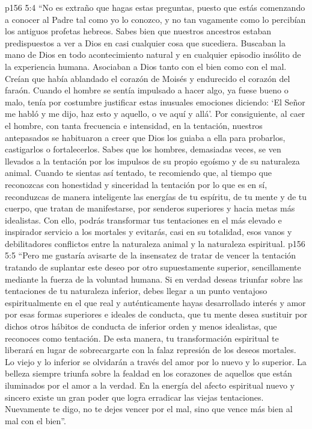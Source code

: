 \vs p156 5:4 “No es extraño que hagas estas preguntas, puesto que estás comenzando a conocer al Padre tal como yo lo conozco, y no tan vagamente como lo percibían los antiguos profetas hebreos. Sabes bien que nuestros ancestros estaban predispuestos a ver a Dios en casi cualquier cosa que sucediera. Buscaban la mano de Dios en todo acontecimiento natural y en cualquier episodio insólito de la experiencia humana. Asociaban a Dios tanto con el bien como con el mal. Creían que había ablandado el corazón de Moisés y endurecido el corazón del faraón. Cuando el hombre se sentía impulsado a hacer algo, ya fuese bueno o malo, tenía por costumbre justificar estas inusuales emociones diciendo: ‘El Señor me habló y me dijo, haz esto y aquello, o ve aquí y allá’. Por consiguiente, al caer el hombre, con tanta frecuencia e intensidad, en la tentación, nuestros antepasados se habituaron a creer que Dios los guiaba a ella para probarlos, castigarlos o fortalecerlos. Sabes que los hombres, demasiadas veces, se ven llevados a la tentación por los impulsos de su propio egoísmo y de su naturaleza animal. Cuando te sientas así tentado, te recomiendo que, al tiempo que reconozcas con honestidad y sinceridad la tentación por lo que es en sí, reconduzcas de manera inteligente las energías de tu espíritu, de tu mente y de tu cuerpo, que tratan de manifestarse, por senderos superiores y hacia metas más idealistas. Con ello, podrás transformar tus tentaciones en el más elevado e inspirador servicio a los mortales y evitarás, casi en su totalidad, esos vanos y debilitadores conflictos entre la naturaleza animal y la naturaleza espiritual.
\vs p156 5:5 “Pero me gustaría avisarte de la insensatez de tratar de vencer la tentación tratando de suplantar este deseo por otro supuestamente superior, sencillamente mediante la fuerza de la voluntad humana. Si en verdad deseas triunfar sobre las tentaciones de tu naturaleza inferior, debes llegar a un punto ventajoso espiritualmente en el que real y auténticamente hayas desarrollado interés y amor por esas formas superiores e ideales de conducta, que tu mente desea sustituir por dichos otros hábitos de conducta de inferior orden y menos idealistas, que reconoces como tentación. De esta manera, tu transformación espiritual te liberará en lugar de sobrecargarte con la falaz represión de los deseos mortales. Lo viejo y lo inferior se olvidarán a través del amor por lo nuevo y lo superior. La belleza siempre triunfa sobre la fealdad en los corazones de aquellos que están iluminados por el amor a la verdad. En la energía del afecto espiritual nuevo y sincero existe un gran poder que logra erradicar las viejas tentaciones. Nuevamente te digo, no te dejes vencer por el mal, sino que vence más bien al mal con el bien”.
